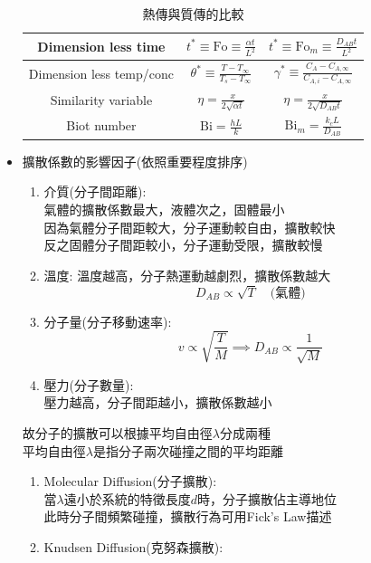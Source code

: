 \documentclass[../main.tex]{subfiles}
\begin{document}
\begin{itemize}
\begin{table}[H]
\begin{tabular}{|c|c|c|}
    \hline
    Dimension less time &
    $t^\ast \equiv \textrm{Fo} \equiv \frac{\alpha t}{L^2}$ &
    $t^\ast \equiv \textrm{Fo}_m \equiv \frac{D_{AB} t}{L^2}$ \\
    \hline
    Dimension less temp/conc &
    $\theta^\ast \equiv \frac{T-T_\infty}{T_s - T_\infty}$ &
    $\gamma^\ast \equiv \frac{C_A-C_{A,\infty}}{C_{A,i} - C_{A,\infty}}$ \\
    \hline
    Similarity variable &
    $\eta = \frac{x}{2\sqrt{\alpha t}}$ &
    $\eta = \frac{x}{2\sqrt{D_{AB} t}}$ \\
    \hline
    Biot number &
    $\textrm{Bi} = \frac{hL}{k}$ &
    $\textrm{Bi}_m = \frac{k_c L}{D_{AB}}$ \\
     \hline
  \end{tabular}
  \caption{熱傳與質傳的比較}
\end{table}
\item 擴散係數的影響因子(依照重要程度排序)
\begin{enumerate}
  \item 介質(分子間距離):\\
  氣體的擴散係數最大，液體次之，固體最小\\
  因為氣體分子間距較大，分子運動較自由，擴散較快\\
  反之固體分子間距較小，分子運動受限，擴散較慢
  \item 溫度: 溫度越高，分子熱運動越劇烈，擴散係數越大
  \begin{equation}
    D_{AB} \propto \sqrt{T} \quad \text{(氣體)}
  \end{equation}
  \item 分子量(分子移動速率):
  \begin{equation}
    v \propto \sqrt{\frac{T}{M}} \implies D_{AB} \propto \frac{1}{\sqrt{M}}
  \end{equation}
  \item 壓力(分子數量):\\
   壓力越高，分子間距越小，擴散係數越小
\end{enumerate}
故分子的擴散可以根據平均自由徑$\lambda$分成兩種\\
平均自由徑$\lambda$是指分子兩次碰撞之間的平均距離
\begin{enumerate}
  \item Molecular Diffusion(分子擴散):\\
  當$\lambda$遠小於系統的特徵長度$d$時，分子擴散佔主導地位\\
  此時分子間頻繁碰撞，擴散行為可用Fick's Law描述
  \item Knudsen Diffusion(克努森擴散):\\

\end{enumerate}
\end{itemize}
\end{document}
